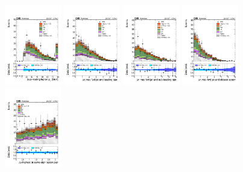 \begin{figure} [!h]
  \centering
  \includegraphics[width=0.22\textwidth]{figures/signalregion_2lss/mumu/Lep2Pt.pdf}
  \includegraphics[width=0.22\textwidth]{figures/signalregion_2lss/mumu/dEtaFwdJetBJet_40.pdf}
  \includegraphics[width=0.22\textwidth]{figures/signalregion_2lss/mumu/dEtaFwdJet2BJet_40.pdf}
  \includegraphics[width=0.22\textwidth]{figures/signalregion_2lss/mumu/dEtaFwdJetClosestLep_40.pdf} \\
  \includegraphics[width=0.22\textwidth]{figures/signalregion_2lss/mumu/dPhiHighestPtSSPair.pdf}

\end{figure}
